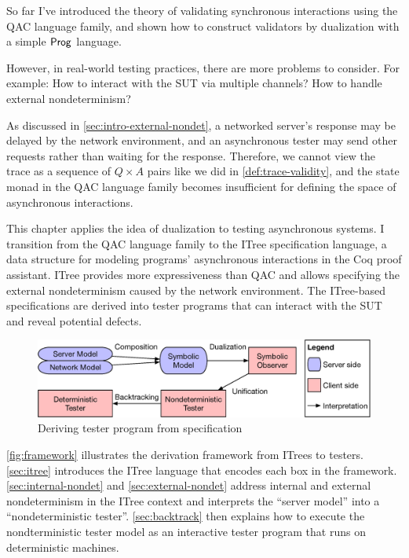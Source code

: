 So far I've introduced the theory of validating synchronous interactions using
the QAC language family, and shown how to construct validators by dualization
with a simple $\mathsf{Prog}$ language.

However, in real-world testing practices, there are more problems to consider.
For example: How to interact with the SUT via multiple channels?  How to handle
external nondeterminism?

As discussed in \autoref{sec:intro-external-nondet}, a networked server's
response may be delayed by the network environment, and an asynchronous tester
may send other requests rather than waiting for the response.  Therefore, we
cannot view the trace as a sequence of $Q\times A$ pairs like we did
in \autoref{def:trace-validity}, and the state monad in the QAC language family
becomes insufficient for defining the space of asynchronous interactions.

This chapter applies the idea of dualization to testing asynchronous systems.  I
transition from the QAC language family to the ITree specification language, a
data structure for modeling programs' asynchronous interactions in the Coq
proof assistant.  ITree provides more expressiveness than QAC and allows
specifying the external nondeterminism caused by the network environment.  The
ITree-based specifications are derived into tester programs that can interact
with the SUT and reveal potential defects.

\begin{figure}[t]
  \includegraphics[width=\linewidth]{figures/framework}
  \caption{Deriving tester program from specification}
  \label{fig:framework}
\end{figure}

\autoref{fig:framework} illustrates the derivation framework from ITrees to
testers.  \autoref{sec:itree} introduces the ITree language that encodes each
box in the framework.  \autoref{sec:internal-nondet} and
\autoref{sec:external-nondet} address internal and external nondeterminism in
the ITree context and interprets the ``server model'' into a ``nondeterministic
tester''.  \autoref{sec:backtrack} then explains how to execute the
nondterministic tester model as an interactive tester program that runs on
deterministic machines.


